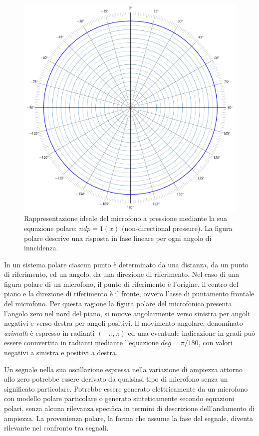 \begin{figure}[t]
\centering
\includegraphics[width=0.99\columnwidth]{CAPITOLI/_TIKZ/POLAR/omni}
\caption{Rappresentazione ideale del microfono a pressione mediante la sua
equazione polare: $ndp = 1(x)$ (non-directional pressure). La figura polare
descrive una risposta in fase lineare per ogni angolo di inncidenza.}
\label{polar:omni}
\end{figure}

In un sistema polare ciascun punto è
determinato da una distanza, da un punto di riferimento, ed un angolo, da una
direzione di riferimento. Nel caso di una figura polare di un microfono, il
punto di riferimento è l'origine, il centro del piano e la direzione di
riferimento è il fronte, ovvero l'asse di puntamento frontale del microfono. Per
questa ragione la figura polare del microfonico presenta l'angolo zero
nel nord del piano, si muove angolarmente verso sinistra per angoli
negativi e verso destra per angoli positivi. Il movimento angolare, denominato
\emph{azimuth} è espresso in radianti $(-\pi,\pi)$ ed una eventuale indicazione in
gradi può essere connvertita in radianti mediante l'equazione $deg = \pi/180$,
con valori negativi a sinistra e positivi a destra.

Un segnale nella sua oscillazione espressa nella variazione di ampiezza
attorno allo zero potrebbe essere derivato da qualsiasi tipo di microfono senza
un significato particolare. Potrebbe essere generato elettricamente da un
microfono con modello polare particolare o generato sinteticamente secondo equazioni polari, senza
alcuna rilevanza specifica in termini di descrizione dell'andamento di ampiezza.
La provenienza polare, la forma che assume la fase del segnale, diventa rilevante nel confronto tra segnali.

